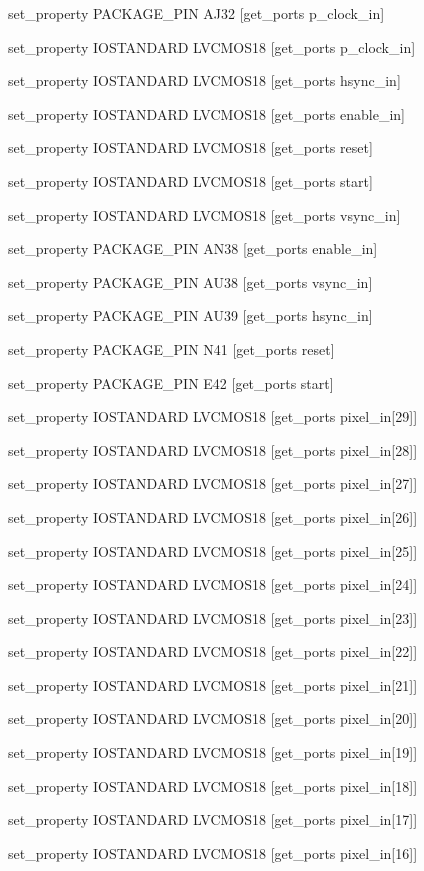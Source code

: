 set\_property PACKAGE\_PIN AJ32 [get\_ports p\_clock\_in]

set\_property IOSTANDARD LVCMOS18 [get\_ports p\_clock\_in]

set\_property IOSTANDARD LVCMOS18 [get\_ports hsync\_in]

set\_property IOSTANDARD LVCMOS18 [get\_ports enable\_in]

set\_property IOSTANDARD LVCMOS18 [get\_ports reset]

set\_property IOSTANDARD LVCMOS18 [get\_ports start]

set\_property IOSTANDARD LVCMOS18 [get\_ports vsync\_in]

set\_property PACKAGE\_PIN AN38 [get\_ports enable\_in]

set\_property PACKAGE\_PIN AU38 [get\_ports vsync\_in]

set\_property PACKAGE\_PIN AU39 [get\_ports hsync\_in]

set\_property PACKAGE\_PIN N41 [get\_ports reset]

set\_property PACKAGE\_PIN E42 [get\_ports start]

set\_property IOSTANDARD LVCMOS18 [get\_ports {pixel\_in[29]}]

set\_property IOSTANDARD LVCMOS18 [get\_ports {pixel\_in[28]}]

set\_property IOSTANDARD LVCMOS18 [get\_ports {pixel\_in[27]}]

set\_property IOSTANDARD LVCMOS18 [get\_ports {pixel\_in[26]}]

set\_property IOSTANDARD LVCMOS18 [get\_ports {pixel\_in[25]}]

set\_property IOSTANDARD LVCMOS18 [get\_ports {pixel\_in[24]}]

set\_property IOSTANDARD LVCMOS18 [get\_ports {pixel\_in[23]}]

set\_property IOSTANDARD LVCMOS18 [get\_ports {pixel\_in[22]}]

set\_property IOSTANDARD LVCMOS18 [get\_ports {pixel\_in[21]}]

set\_property IOSTANDARD LVCMOS18 [get\_ports {pixel\_in[20]}]

set\_property IOSTANDARD LVCMOS18 [get\_ports {pixel\_in[19]}]

set\_property IOSTANDARD LVCMOS18 [get\_ports {pixel\_in[18]}]

set\_property IOSTANDARD LVCMOS18 [get\_ports {pixel\_in[17]}]

set\_property IOSTANDARD LVCMOS18 [get\_ports {pixel\_in[16]}]

